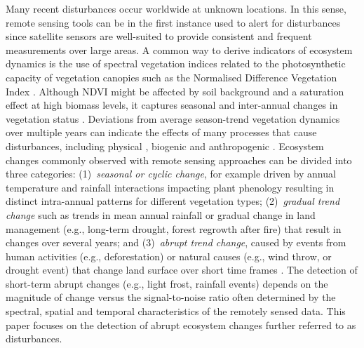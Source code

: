 \documentclass[authoryear,preprint,review,10pt]{elsarticle}
\begin{document}
Many recent disturbances occur worldwide at unknown locations. In this sense, remote sensing tools can be in the first instance used to alert for disturbances since satellite sensors are well-suited to provide consistent and frequent measurements over large areas. A common way to derive indicators of ecosystem dynamics is the use of spectral vegetation indices related to the photosynthetic capacity of vegetation canopies such as the Normalised Difference Vegetation Index \citep[NDVI,][]{Myneni1995, Pettorelli:2005ed, Potter2003}.  Although NDVI might be affected by soil background and a saturation effect at high biomass levels, it captures seasonal and inter-annual changes in vegetation status \citep{Huete2002,Myneni:1997ur}. Deviations from average season-trend vegetation dynamics over multiple years can indicate the effects of many processes that cause disturbances, including physical \citep[e.g., droughts, fires, floods;][]{Funk:2009vf,Vrieling:2011da}, biogenic \citep[e.g., herbivorous insects, pathogens;][]{Hargrove2009, Stone2008, Verbesselt2009} and anthropogenic \citep[e.g., deforestation, urbanisation;][]{Asner:2011fa, Jin2005, Potter2003}. Ecosystem changes commonly observed with remote sensing approaches can be divided into three categories: 
(1)~\emph{seasonal or cyclic change}, for example driven by annual temperature and rainfall interactions impacting plant phenology resulting in distinct intra-annual patterns for different vegetation types; 
(2)~\emph{gradual trend change} such as trends in mean annual rainfall or gradual change in land management (e.g., long-term drought, forest regrowth after fire) that result in changes over several years; and 
(3)~\emph{abrupt trend change}, caused by events from human activities (e.g., deforestation) or natural causes (e.g., wind throw, or drought event) that change land surface over short time frames 
\citep[e.g., days to weeks or months;][]{Verbesselt2009a,Verbesselt:2010wo, Vogelmann:2012hm}. The detection of short-term abrupt changes (e.g., light frost, rainfall events) depends on the magnitude of change versus the signal-to-noise ratio often determined by the spectral, spatial and temporal characteristics of the remotely sensed data. This paper focuses on the detection of abrupt ecosystem changes further referred to as disturbances. 
\end{document}

